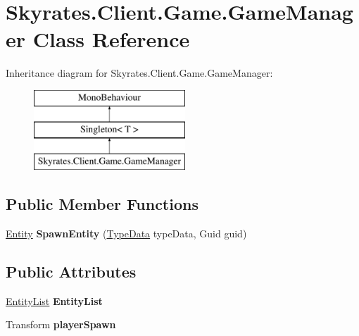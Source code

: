 \hypertarget{class_skyrates_1_1_client_1_1_game_1_1_game_manager}{\section{Skyrates.\-Client.\-Game.\-Game\-Manager Class Reference}
\label{class_skyrates_1_1_client_1_1_game_1_1_game_manager}
}
Inheritance diagram for Skyrates.\-Client.\-Game.\-Game\-Manager\-:\begin{figure}[H]
\begin{center}
\leavevmode
\includegraphics[height=3.000000cm]{class_skyrates_1_1_client_1_1_game_1_1_game_manager}
\end{center}
\end{figure}
\subsection*{Public Member Functions}
\begin{DoxyCompactItemize}
\item 
\hypertarget{class_skyrates_1_1_client_1_1_game_1_1_game_manager_a6e51a6da825e012e4f6eb6bfc81ae85d}{\hyperlink{class_skyrates_1_1_common_1_1_entity_1_1_entity}{Entity} {\bfseries Spawn\-Entity} (\hyperlink{class_skyrates_1_1_common_1_1_entity_1_1_type_data}{Type\-Data} type\-Data, Guid guid)}\label{class_skyrates_1_1_client_1_1_game_1_1_game_manager_a6e51a6da825e012e4f6eb6bfc81ae85d}

\end{DoxyCompactItemize}
\subsection*{Public Attributes}
\begin{DoxyCompactItemize}
\item 
\hypertarget{class_skyrates_1_1_client_1_1_game_1_1_game_manager_a6cd625a0d48f736b04afc3ec98e4ed53}{\hyperlink{class_skyrates_1_1_common_1_1_entity_1_1_entity_list}{Entity\-List} {\bfseries Entity\-List}}\label{class_skyrates_1_1_client_1_1_game_1_1_game_manager_a6cd625a0d48f736b04afc3ec98e4ed53}

\item 
\hypertarget{class_skyrates_1_1_client_1_1_game_1_1_game_manager_a39846b49f8069b0d99ce5622aac06ac8}{Transform {\bfseries player\-Spawn}}\label{class_skyrates_1_1_client_1_1_game_1_1_game_manager_a39846b49f8069b0d99ce5622aac06ac8}

\end{DoxyCompactItemize}
